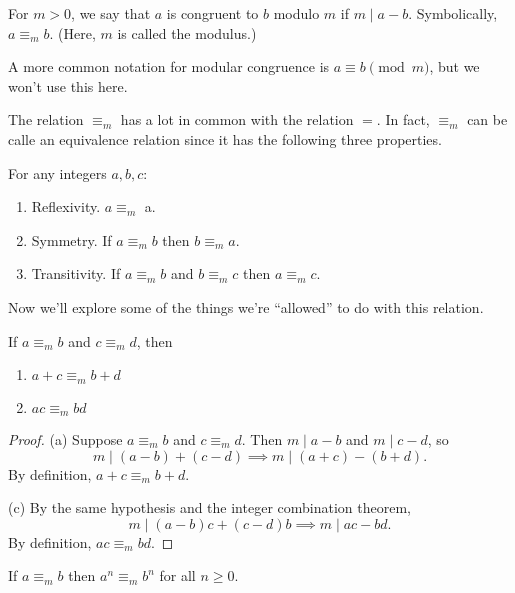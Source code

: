 \documentclass[../m055main.tex]{subfiles}
\begin{document}
\begin{definition}
    For $m > 0$, we say that $a$ is congruent to $b$ modulo $m$ if $m \mid a - b$.
    Symbolically, $a \equiv_m b$.
    (Here, $m$ is called the modulus.)
\end{definition}

A more common notation for modular congruence is $a \equiv b \pmod m$, but we won't use this here.

The relation $\equiv_m$ has a lot in common with the relation $=$.
In fact, $\equiv_m$ can be calle an equivalence relation since it has the following three properties.

\begin{theorem}
    For any integers $a, b, c$:
    \begin{enumerate}[label=(\alph*)]
        \item Reflexivity. $a \equiv_m$ a.
        \item Symmetry. If $a \equiv_m b$ then $b \equiv_m a$.
        \item Transitivity. If $a \equiv_m b$ and $b \equiv_m c$ then $a \equiv_m c$.
    \end{enumerate}
\end{theorem}

Now we'll explore some of the things we're ``allowed'' to do with this relation.

\begin{theorem}
    If $a \equiv_m b$ and $c \equiv_m d$, then
    \begin{enumerate}[label=(\alph*)]
        \item $a + c \equiv_m b + d$
        \item $ac \equiv_m bd$
    \end{enumerate}
\end{theorem}

\begin{proof}
    (a) Suppose $a \equiv_m b$ and $c \equiv_m d$.
    Then $m \mid a-b$ and $m \mid c-d$, so
    \[ m \mid (a - b) + (c - d) \implies m \mid (a + c) - (b + d). \]
    By definition, $a + c \equiv_m b + d$.
    \smallskip

    (c) By the same hypothesis and the integer combination theorem,
    \[ m \mid (a - b)c + (c - d)b \implies m \mid ac - bd. \]
    By definition, $ac \equiv_m bd$.
\end{proof}


\begin{corollary}
    If $a \equiv_m b$ then $a^n \equiv_m b^n$ for all $n \geq 0$.
\end{corollary}
\end{document}
